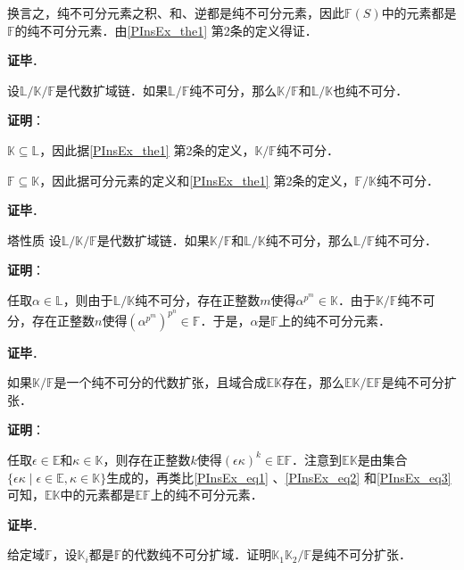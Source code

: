 换言之，纯不可分元素之积、和、逆都是纯不可分元素，因此$\mathbb{F}(S)$中的元素都是$\mathbb{F}$的纯不可分元素．由\autoref{PInsEx_the1} 第2条的定义得证．

\textbf{证毕}．




\begin{theorem}{}
设$\mathbb{L}/\mathbb{K}/\mathbb{F}$是代数扩域链．如果$\mathbb{L}/\mathbb{F}$纯不可分，那么$\mathbb{K}/\mathbb{F}$和$\mathbb{L}/\mathbb{K}$也纯不可分．
\end{theorem}

\textbf{证明}：

$\mathbb{K}\subseteq\mathbb{L}$，因此据\autoref{PInsEx_the1} 第2条的定义，$\mathbb{K}/\mathbb{F}$纯不可分．

$\mathbb{F}\subseteq\mathbb{K}$，因此据可分元素的定义和\autoref{PInsEx_the1} 第2条的定义，$\mathbb{F}/\mathbb{K}$纯不可分．


\textbf{证毕}．


\begin{theorem}{塔性质}
设$\mathbb{L}/\mathbb{K}/\mathbb{F}$是代数扩域链．如果$\mathbb{K}/\mathbb{F}$和$\mathbb{L}/\mathbb{K}$纯不可分，那么$\mathbb{L}/\mathbb{F}$纯不可分．
\end{theorem}

\textbf{证明}：

任取$\alpha\in\mathbb{L}$，则由于$\mathbb{L}/\mathbb{K}$纯不可分，存在正整数$m$使得$\alpha^{p^m}\in\mathbb{K}$．由于$\mathbb{K}/\mathbb{F}$纯不可分，存在正整数$n$使得$(\alpha^{p^m})^{p^n}\in\mathbb{F}$．于是，$\alpha$是$\mathbb{F}$上的纯不可分元素．

\textbf{证毕}．


\begin{theorem}{}
如果$\mathbb{K}/\mathbb{F}$是一个纯不可分的代数扩张，且域合成$\mathbb{EK}$存在，那么$\mathbb{EK}/\mathbb{EF}$是纯不可分扩张．
\end{theorem}

\textbf{证明}：

任取$\epsilon\in\mathbb{E}$和$\kappa\in\mathbb{K}$，则存在正整数$k$使得$(\epsilon\kappa)^k\in\mathbb{EF}$．注意到$\mathbb{EK}$是由集合$\{\epsilon\kappa\mid\epsilon\in\mathbb{E}, \kappa\in\mathbb{K}\}$生成的，再类比\autoref{PInsEx_eq1} 、\autoref{PInsEx_eq2} 和\autoref{PInsEx_eq3} 可知，$\mathbb{EK}$中的元素都是$\mathbb{EF}$上的纯不可分元素．

\textbf{证毕}．


\begin{exercise}{}
给定域$\mathbb{F}$，设$\mathbb{K}_i$都是$\mathbb{F}$的代数纯不可分扩域．证明$\mathbb{K}_1\mathbb{K}_2/\mathbb{F}$是纯不可分扩张．
\end{exercise}

